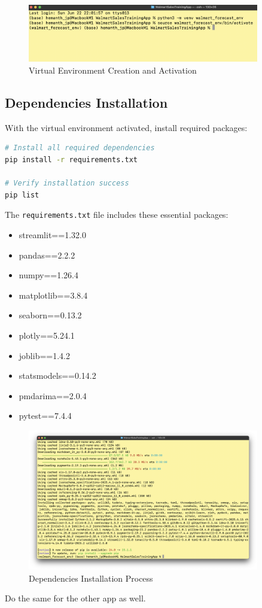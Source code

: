 \begin{figure}[H]
    \centering
   \includegraphics[width=0.9\textwidth]{Images/02InstallationAndSetup/VirtualEnvironment.png}
    \caption{Virtual Environment Creation and Activation}
    \label{fig:virtual_environment}
\end{figure}

\subsection{Dependencies Installation}

With the virtual environment activated, install required packages:

\begin{lstlisting}[language=bash]
# Install all required dependencies
pip install -r requirements.txt

# Verify installation success
pip list
\end{lstlisting}

The \texttt{requirements.txt} file includes these essential packages:
\begin{itemize}
    \item streamlit==1.32.0
    \item pandas==2.2.2
    \item numpy==1.26.4
    \item matplotlib==3.8.4
    \item seaborn==0.13.2
    \item plotly==5.24.1
    \item joblib==1.4.2
    \item statsmodels==0.14.2
    \item pmdarima==2.0.4
    \item pytest==7.4.4
\end{itemize}

\begin{figure}[H]
    \centering
    \includegraphics[width=0.9\textwidth]{Images/02InstallationAndSetup/DependenciesInstall.png}
    \caption{Dependencies Installation Process}
    \label{fig:dependencies_install}
\end{figure}
Do the same for the other app as well.

